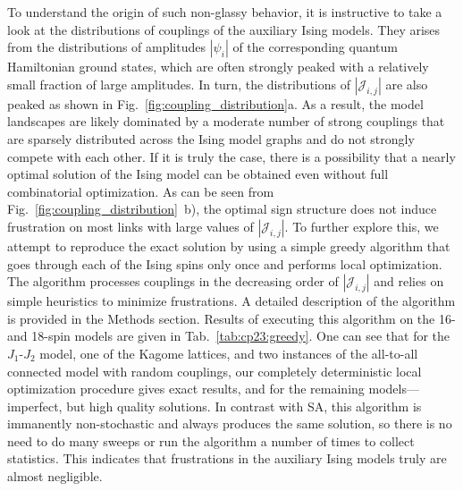 To understand the origin of such non-glassy behavior, it is instructive to take a look at the distributions of couplings of the auxiliary Ising models. They arises from the distributions of amplitudes $|\psi_i|$ of the corresponding quantum Hamiltonian ground states, which are often strongly peaked with a relatively small fraction of large amplitudes. In turn, the distributions of $|\mathcal{J}_{i,j}|$ are also peaked as shown in Fig.~\ref{fig:coupling_distribution}a. As a result, the model landscapes are likely dominated by a moderate number of strong couplings that are sparsely distributed across the Ising model graphs and do not strongly compete with each other. If it is truly the case, there is a possibility that a nearly optimal solution of the Ising model can be obtained even without full combinatorial optimization. As can be seen from Fig.~\ref{fig:coupling_distribution}~b), the optimal sign structure does not induce frustration on most links with large values of $|\mathcal{J}_{i,j}|$. To further explore this, we attempt to reproduce the exact solution by using a simple greedy algorithm that goes through each of the Ising spins only once and performs local optimization. The algorithm processes couplings in the decreasing order of $|\mathcal{J}_{i,j}|$ and relies on simple heuristics to minimize frustrations. A detailed description of the algorithm is provided in the Methods section. Results of executing this algorithm on the 16- and 18-spin models are given in Tab.~\ref{tab:cp23:greedy}. One can see that for the $J_1$-$J_2$ model, one of the Kagome lattices, and two instances of the all-to-all connected model with random couplings, our completely deterministic local optimization procedure gives exact results, and for the remaining models---imperfect, but high quality solutions. In contrast with SA, this algorithm is immanently non-stochastic and always produces the same solution, so there is no need to do many sweeps or run the algorithm a number of times to collect statistics. This indicates that frustrations in the auxiliary Ising models truly are almost negligible.


